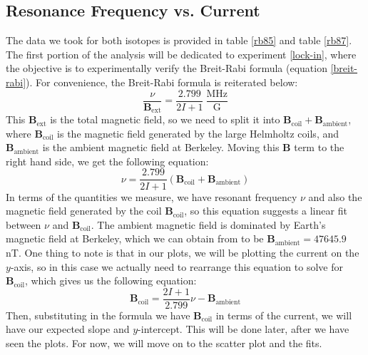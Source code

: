 \documentclass[10pt]{article}
\begin{document}
	\subsection{Resonance Frequency vs. Current} 
	The data we took for both isotopes is provided in table \ref{rb85} and table
	\ref{rb87}. The first portion of the analysis will be dedicated to experiment
	\ref{lock-in}, where the objective is to experimentally verify the Breit-Rabi
	formula (equation \ref{breit-rabi}). For convenience, the Breit-Rabi formula is
	reiterated below:
	\[
		\frac{\nu}{\mathbf{B}_\text{ext}} = \frac{2.799}{2I + 1} \
		\frac{\text{MHz}}{\text{G}}
	\]
	This \( \mathbf{B}_\text{ext} \) is the total magnetic field, so we need to split
	it into \( \mathbf{B}_\text{coil} + \mathbf{B}_\text{ambient} \), where \(
	\mathbf{B}_\text{coil} \) is the magnetic field generated by the large Helmholtz
	coils, and \( \mathbf{B}_\text{ambient} \) is the ambient magnetic field at
	Berkeley. Moving this \( \mathbf{B} \) term to the right hand side, we get the 
	following equation:
	\[
		\nu = \frac{2.799}{2I + 1}(\mathbf{B}_\text{coil} +
		\mathbf{B}_\text{ambient})
	\]
	In terms of the quantities we measure, we have resonant frequency \( \nu \) and
	also the magnetic field generated by the coil \( \mathbf{B}_\text{coil} \), so
	this equation suggests a linear fit between \( \nu \) and \(
	\mathbf{B}_\text{coil} \). The ambient magnetic field is dominated by Earth's
	magnetic field at Berkeley, which we can obtain from \cite{WorldMagneticModel2020} 
	to be \(
	\mathbf{B}_\text{ambient} = 47645.9 \) nT. One thing to note is that in our
	plots, we will be plotting the current on the \( y \)-axis, so in this case we
	actually need to rearrange this equation to solve for \( \mathbf{B}_\text{coil}
	\), which gives us the following equation:
	\begin{equation}
		\label{linear-fit}
		\mathbf{B}_\text{coil} = \frac{2I + 1}{2.799}\nu -
		\mathbf{B}_\text{ambient} 
	\end{equation}
	Then, substituting in the formula we have \( \mathbf{B}_\text{coil} \) in terms
	of the current, we will have our expected slope and \( y \)-intercept. This will
	be done later, after we have seen the plots. For now, we will move on to the
	scatter plot and the fits. 
\end{document}
